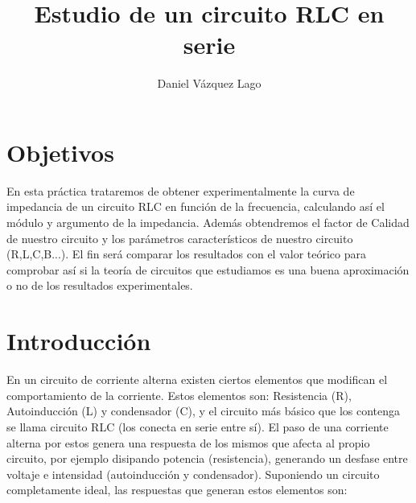 \documentclass[12pt,a4paper]{article}
\author{Daniel Vázquez Lago}
\title{Estudio de un circuito RLC en serie}
\begin{document}
\maketitle
\newpage

\tableofcontents

\newpage

\section{Objetivos}

En esta práctica trataremos de obtener experimentalmente la curva de impedancia de un circuito RLC en función de la frecuencia, calculando así el módulo y argumento de la impedancia. Además obtendremos el factor de Calidad de nuestro circuito y los parámetros  característicos de nuestro circuito (R,L,C,B...). El fin será comparar los resultados con el valor teórico para comprobar así si la teoría de circuitos que estudiamos es una buena aproximación o no de los resultados experimentales. 

\section{Introducción}

En un circuito de corriente alterna existen ciertos elementos que modifican el comportamiento de la corriente. Estos elementos son: Resistencia (R), Autoinducción (L) y condensador (C), y el circuito más básico que los contenga se llama circuito RLC (los conecta en serie entre sí). El paso de una corriente alterna por estos genera una respuesta de los mismos que afecta al propio circuito, por ejemplo disipando potencia (resistencia), generando un desfase entre voltaje e intensidad (autoinducción y condensador). Suponiendo un circuito completamente ideal, las respuestas que generan estos elementos son:
\end{document}
